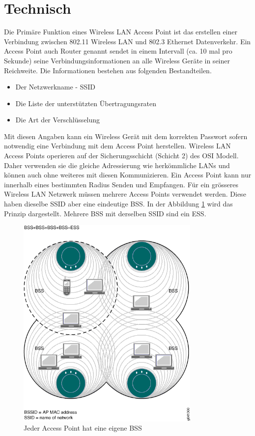 \section{Technisch}
Die Primäre Funktion eines Wireless LAN Access Point ist das erstellen einer Verbindung zwischen 802.11 Wireless LAN und 802.3 Ethernet Datenverkehr. Ein Access Point auch Router genannt sendet in einem Intervall (ca. 10 mal pro Sekunde) seine Verbindungsinformationen an alle Wireless Geräte in seiner Reichweite. Die Informationen bestehen aus folgenden Bestandteilen.
\begin{itemize}
\item Der Netzwerkname - SSID
\item Die Liste der unterstützten Übertragungsraten
\item Die Art der Verschlüsselung
\end{itemize}
Mit diesen Angaben kann ein Wireless Gerät mit dem korrekten Passwort sofern notwendig eine Verbindung mit dem Access Point herstellen. Wireless LAN Access Points operieren auf der Sicherungsschicht (Schicht 2) des OSI Modell. Daher verwenden sie die gleiche Adressierung wie herkömmliche LANs und können auch ohne weiteres mit diesen Kommunizieren. Ein Access Point kann nur innerhalb eines bestimmten Radius Senden und Empfangen. Für ein grösseres Wireless LAN Netzwerk müssen mehrere Access Points verwendet werden. Diese haben dieselbe SSID aber eine eindeutige BSS. In der Abbildung \ref{fig:bssap} wird das Prinzip dargestellt. Mehrere BSS mit derselben SSID sind ein ESS.
\begin{figure}[ht]
	\centering
	\includegraphics[width=0.8\textwidth]{images/bssssid.png}
	\caption{Jeder Access Point hat eine eigene BSS}
	\label{fig:bssap}
\end{figure}


